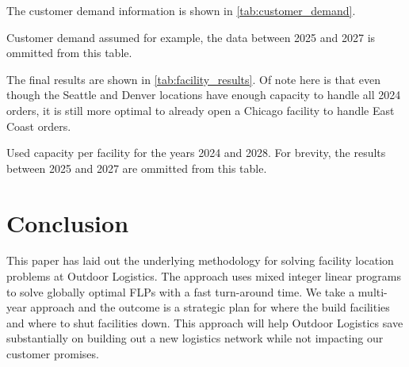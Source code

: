 \documentclass[hidelinks,twoside,10pt,letterpaper]{../note}
\begin{document}
The customer demand information is shown in \cref{tab:customer_demand}.


\begin{table}[h]
  \caption{Customer demand assumed for example, the data between 2025 and 2027 is ommitted from this table.}\label{tab:customer_demand}
\end{table}

The final results are shown in \cref{tab:facility_results}.
Of note here is that even though the Seattle and Denver locations have enough capacity to handle all 2024 orders, it is still more optimal to already open a Chicago facility to handle East Coast orders.

\begin{table}[h]
  \caption{Used capacity per facility for the years 2024 and 2028. For brevity, the results between 2025 and 2027 are ommitted from this table.}\label{tab:facility_results}
\end{table}

\section{Conclusion}

This paper has laid out the underlying methodology for solving facility location problems at Outdoor Logistics.
The approach uses mixed integer linear programs to solve globally optimal FLPs with a fast turn-around time.
We take a multi-year approach and the outcome is a strategic plan for where the build facilities and where to shut facilities down.
This approach will help Outdoor Logistics save substantially on building out a new logistics network while not impacting our customer promises.


\end{document}
